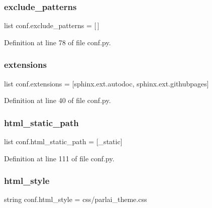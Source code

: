 \subsubsection{\texorpdfstring{exclude\+\_\+patterns}{exclude\_patterns}}
{\footnotesize\ttfamily list conf.\+exclude\+\_\+patterns = \mbox{[}$\,$\mbox{]}}



Definition at line 78 of file conf.\+py.

\mbox{\label{namespaceconf_ae475e080536acb271a0a0efe56c3ba42}} 
\subsubsection{\texorpdfstring{extensions}{extensions}}
{\footnotesize\ttfamily list conf.\+extensions = \mbox{[}\textquotesingle{}sphinx.\+ext.\+autodoc\textquotesingle{}, \textquotesingle{}sphinx.\+ext.\+githubpages\textquotesingle{}\mbox{]}}



Definition at line 40 of file conf.\+py.

\mbox{\label{namespaceconf_af4fb5d8851ccaade135c2668dd3ced41}} 
\subsubsection{\texorpdfstring{html\+\_\+static\+\_\+path}{html\_static\_path}}
{\footnotesize\ttfamily list conf.\+html\+\_\+static\+\_\+path = \mbox{[}\textquotesingle{}\+\_\+static\textquotesingle{}\mbox{]}}



Definition at line 111 of file conf.\+py.

\mbox{\label{namespaceconf_a5622a8722272baed29b41d8771ecbe3c}} 
\subsubsection{\texorpdfstring{html\+\_\+style}{html\_style}}
{\footnotesize\ttfamily string conf.\+html\+\_\+style = \textquotesingle{}css/parlai\+\_\+theme.\+css\textquotesingle{}}



